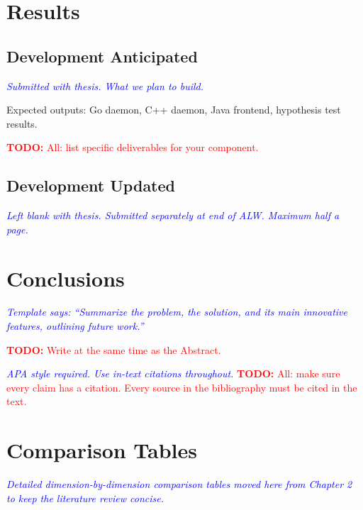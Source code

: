 \documentclass[12pt,oneside]{report}
\newcommand{\note}[1]{\textcolor{blue}{\textit{#1}}}
\newcommand{\todo}[1]{\textcolor{red}{\textbf{TODO:} #1}}
\begin{document}
\chapter{Results}

\section{Development Anticipated}
\note{Submitted with thesis. What we plan to build.}

Expected outputs: Go daemon, C++ daemon, Java frontend, hypothesis test results.

\todo{All: list specific deliverables for your component.}

\section{Development Updated}
\note{Left blank with thesis. Submitted separately at end of ALW. Maximum half a page.}

\chapter{Conclusions}

\note{Template says: ``Summarize the problem, the solution, and its main innovative features, outlining future work.''}

\todo{Write at the same time as the Abstract.}

\newpage
\note{APA style required. Use in-text citations throughout.}
\todo{All: make sure every claim has a citation. Every source in the bibliography must be cited in the text.}

\appendix
\chapter{Comparison Tables}
\note{Detailed dimension-by-dimension comparison tables moved here from Chapter 2 to keep the literature review concise.}
\end{document}

